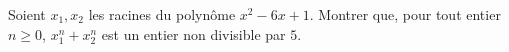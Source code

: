 Soient $x_1, x_2$ les racines du polynôme $x^2 - 6x + 1$. Montrer que, pour tout entier $n \geq 0$, $x_1^n + x_2^n$ est un entier non divisible par $5$.
